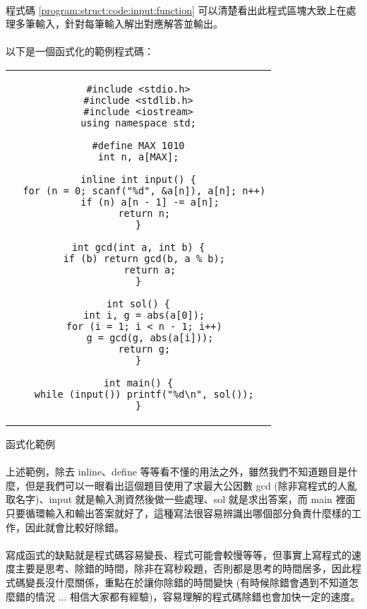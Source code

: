 \documentclass[12pt,a4paper,oneside]{report}
\begin{document}
\begin{CJK}{UTF8}{bkai}
\paragraph{}程式碼 \ref{program:struct:code:input:function} 可以清楚看出此程式區塊大致上在處理多筆輸入，針對每筆輸入解出對應解答並輸出。
\paragraph{}以下是一個函式化的範例程式碼：

\begin{code}[h!]
\centering
\begin{tabular}{c}
\begin{lstlisting}
#include <stdio.h>
#include <stdlib.h>
#include <iostream>
using namespace std;

#define MAX 1010
int n, a[MAX];

inline int input() {
  for (n = 0; scanf("%d", &a[n]), a[n]; n++)
    if (n) a[n - 1] -= a[n];
  return n;
}

int gcd(int a, int b) {
  if (b) return gcd(b, a % b);
    return a;
}

int sol() {
  int i, g = abs(a[0]);
  for (i = 1; i < n - 1; i++)
    g = gcd(g, abs(a[i]));
  return g;
}

int main() {
  while (input()) printf("%d\n", sol());
}
\end{lstlisting}
\end{tabular}
\caption{函式化範例}
\label{program:struct:code:input:function:example}
\end{code}

\paragraph{}上述範例，除去 inline、define 等等看不懂的用法之外，雖然我們不知道題目是什麼，但是我們可以一眼看出這個題目使用了求最大公因數 gcd (除非寫程式的人亂取名字)、input 就是輸入測資然後做一些處理、sol 就是求出答案，而 main 裡面只要循環輸入和輸出答案就好了，這種寫法很容易辨識出哪個部分負責什麼樣的工作，因此就會比較好除錯。

\paragraph{}寫成函式的缺點就是程式碼容易變長、程式可能會較慢等等，但事實上寫程式的速度主要是思考、除錯的時間，除非在寫秒殺題，否則都是思考的時間居多，因此程式碼變長沒什麼關係，重點在於讓你除錯的時間變快 (有時候除錯會遇到不知道怎麼錯的情況 ... 相信大家都有經驗)，容易理解的程式碼除錯也會加快一定的速度。


\end{CJK}
\end{document}
